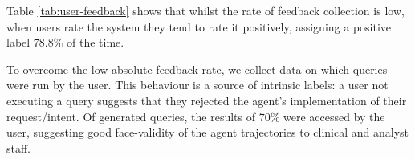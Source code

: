 \documentclass[11pt]{article}
\begin{document}
Table \ref{tab:user-feedback} shows that whilst the rate of feedback collection is low, when users rate the system they tend to rate it positively, assigning a positive label 78.8\% of the time.

To overcome the low absolute feedback rate, we collect data on which queries were run by the user.
This behaviour is a source of intrinsic labels: a user not executing a query suggests that they rejected the agent's implementation of their request/intent.
Of generated queries, the results of 70\% were accessed by the user, suggesting good face-validity of the agent trajectories to clinical and analyst staff.



\end{document}

